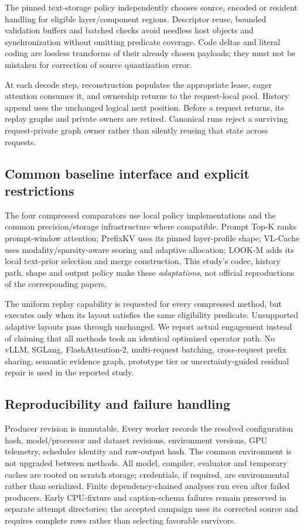 The pinned text-storage policy independently chooses source, encoded or
resident handling for eligible layer/component regions. Descriptor reuse,
bounded validation buffers and batched checks avoid needless host objects
and synchronization without omitting predicate coverage. Code deltas and
literal coding are lossless transforms of their already chosen payloads;
they must not be mistaken for correction of source quantization error.

At each decode step, reconstruction populates the appropriate lease, eager
attention consumes it, and ownership returns to the request-local pool.
History append uses the unchanged logical next position. Before a request
returns, its replay graphs and private owners are retired. Canonical runs
reject a surviving request-private graph owner rather than silently reusing
that state across requests.

\subsection{Common baseline interface and explicit restrictions}
The four compressed comparators use local policy implementations and the
common precision/storage infrastructure where compatible. Prompt Top-K
ranks prompt-window attention; PrefixKV uses its pinned layer-profile
shape; VL-Cache uses modality/sparsity-aware scoring and adaptive allocation;
LOOK-M adds its local text-prior selection and merge construction. This
study's codec, history path, shape and output policy make these
\emph{adaptations}, not official reproductions of the corresponding papers.

The uniform replay capability is requested for every compressed method, but
executes only when its layout satisfies the same eligibility predicate.
Unsupported adaptive layouts pass through unchanged. We report actual
engagement instead of claiming that all methods took an identical optimized
operator path. No vLLM, SGLang, FlashAttention-2, multi-request batching,
cross-request prefix sharing, semantic evidence graph, prototype tier or
uncertainty-guided residual repair is used in the reported study.

\subsection{Reproducibility and failure handling}
Producer revision \SourceRev{} is immutable. Every worker records the
resolved configuration hash, model/processor and dataset revisions,
environment versions, GPU telemetry, scheduler identity and raw-output hash.
The common environment is not upgraded between methods. All model,
compiler, evaluator and temporary caches are rooted on scratch storage;
credentials, if required, are environmental rather than serialized.
Finite dependency-chained analyses run even after failed producers. Early
CPU-fixture and caption-schema failures remain preserved in separate
attempt directories; the accepted campaign uses its corrected source and
requires complete rows rather than selecting favorable survivors.
